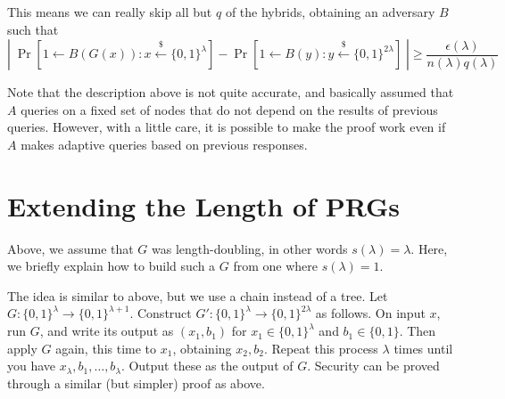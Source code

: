 This means we can really skip all but $q$ of the hybrids, obtaining an adversary $B$ such that 
\[|\;\Pr[1\gets B(G(x)):x\stackrel{\$}{\gets}\{0,1\}^\lambda]-\Pr[1\gets B(y):y\stackrel{\$}{\gets}\{0,1\}^{2\lambda}]\;|\geq \frac{\epsilon(\lambda)}{n(\lambda)q(\lambda)}\]

Note that the description above is not quite accurate, and basically assumed that $A$ queries on a fixed set of nodes that do not depend on the results of previous queries.  However, with a little care, it is possible to make the proof work even if $A$ makes adaptive queries based on previous responses.

\section{Extending the Length of PRGs}

Above, we assume that $G$ was length-doubling, in other words $s(\lambda)=\lambda$.  Here, we briefly explain how to build such a $G$ from one where $s(\lambda)=1$.  

The idea is similar to above, but we use a chain instead of a tree.  Let $G:\{0,1\}^\lambda\rightarrow\{0,1\}^{\lambda+1}$.  Construct $G':\{0,1\}^\lambda\rightarrow\{0,1\}^{2\lambda}$ as follows.  On input $x$, run $G$, and write its output as $(x_1,b_1)$ for $x_1\in\{0,1\}^\lambda$ and $b_1\in\{0,1\}$.  Then apply $G$ again, this time to $x_1$, obtaining $x_2,b_2$.  Repeat this process $\lambda$ times until you have $x_\lambda,b_1,\dots,b_\lambda$.  Output these as the output of $G$.  Security can be proved through a similar (but simpler) proof as above.

